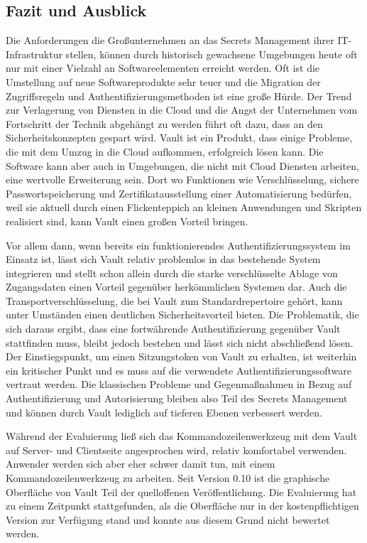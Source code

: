 \documentclass[
book,
a4paper,   
titlepage,  
halfparskip,
12pt        
]{scrartcl}
\begin{document}
\begin{onehalfspacing}
\newpage
\section{Fazit und Ausblick}
\label{sec:ausblick}

Die Anforderungen die Großunternehmen an das Secrets Management ihrer \ac{IT}-Infrastruktur stellen, können durch historisch gewachsene Umgebungen heute oft nur mit einer Vielzahl an Softwareelementen erreicht werden. Oft ist die Umstellung auf neue Softwareprodukte sehr teuer und die Migration der Zugriffsregeln und Authentifizierungsmethoden ist eine große Hürde. Der Trend zur Verlagerung von Diensten in die Cloud und die Angst der Unternehmen vom Fortschritt der Technik abgehängt zu werden führt oft dazu, dass an den Sicherheitskonzepten gespart wird. Vault ist ein Produkt, dass einige Probleme, die mit dem Umzug in die Cloud aufkommen, erfolgreich lösen kann. Die Software kann aber auch in Umgebungen, die nicht mit Cloud Diensten arbeiten, eine wertvolle Erweiterung sein. Dort wo Funktionen wie Verschlüsselung, sichere Passwortspeicherung und Zertifikatausstellung einer Automatisierung bedürfen, weil sie aktuell durch einen Flickenteppich an kleinen Anwendungen und Skripten realisiert sind, kann Vault einen großen Vorteil bringen.

Vor allem dann, wenn bereits ein funktionierendes Authentifizierungssystem im Einsatz ist, lässt sich Vault relativ problemlos in das bestehende System integrieren und stellt schon allein durch die starke verschlüsselte Ablage von Zugangsdaten einen Vorteil gegenüber herkömmlichen Systemen dar. Auch die Transportverschlüsselung, die bei Vault zum Standardrepertoire gehört, kann unter Umständen einen deutlichen Sicherheitsvorteil bieten. 
Die Problematik, die sich daraus ergibt, dass eine fortwährende Authentifizierung gegenüber Vault stattfinden muss, bleibt jedoch bestehen und lässt sich nicht abschließend lösen. Der Einstiegspunkt, um einen Sitzungstoken von Vault zu erhalten, ist weiterhin ein kritischer Punkt und es muss auf die verwendete Authentifizierungssoftware vertraut werden. Die klassischen Probleme und Gegenmaßnahmen in Bezug auf Authentifizierung und Autorisierung bleiben also Teil des Secrets Management und können durch Vault lediglich auf tieferen Ebenen verbessert werden.

Während der Evaluierung ließ sich das Kommandozeilenwerkzeug mit dem Vault auf Server- und Clientseite angesprochen wird, relativ komfortabel verwenden. Anwender werden sich aber eher schwer damit tun, mit einem Kommandozeilenwerkzeug zu arbeiten. Seit Version 0.10 ist die graphische Oberfläche von Vault Teil der quelloffenen Veröffentlichung. Die Evaluierung hat zu einem Zeitpunkt stattgefunden, als die Oberfläche nur in der kostenpflichtigen Version zur Verfügung stand und konnte aus diesem Grund nicht bewertet werden. 


\end{onehalfspacing}
\end{document}
